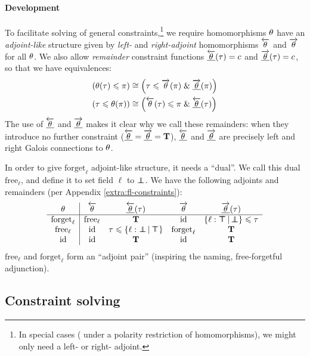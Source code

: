 \paragraph{Development}
To facilitate solving of general constraints,\footnote{In special cases (\eg{} under a polarity restriction of homomorphisms), we might only need a left- or right- adjoint.} we require homomorphisms $\theta$ have an \emph{adjoint-like} structure given by \emph{left-} and \emph{right-adjoint} homomorphisms $\overleftarrow{\theta}$ and $\overrightarrow{\theta}$ for all $\theta$. We also allow \emph{remainder} constraint functions $\underline{\overleftarrow{\theta}}(\tau) = c$ and $\underline{\overrightarrow{\theta}}(\tau) = c$, so that we have equivalences:
\begin{align*}
(\morph(\tau) \sub \pi) &\cstreq \left(\tau \sub \radj \morph(\pi) \und \radjrest \morph(\pi) \right) \\
(\tau \sub \morph(\pi)) &\cstreq \left(\ladj \morph(\tau) \sub \pi \und \ladjrest \morph(\tau) \right)
\end{align*}
The use of $\underline{\overleftarrow{\theta}}$ and $\underline{\overrightarrow{\theta}}$ makes it clear why we call these remainders: when they introduce no further constraint ($\underline{\overleftarrow{\theta}} = \underline{\overrightarrow{\theta}} = \mathbf T$), $\underline{\overleftarrow{\theta}}$ and $\underline{\overrightarrow{\theta}}$ are precisely left and right Galois connections to $\theta$.

\begin{example}
    In order to give $\mathrm{forget}_\ell$  adjoint-like structure, it needs a \enquote{dual}. We call this dual $\mathrm{free}_\ell$, and define it to set field $\ell$ to $\bot \!\!\!\! \bot$. We have the following adjoints and remainders (per Appendix \ref{extra:fl-constraints}):
    $$\begin{array}{c|cccc}
    \morph & \ladj \morph & \ladjrest \morph(\tau) & \radj \morph & \radjrest \morph(\tau) \\ \hline 
    \mathrm{forget}_\ell & \mathrm{free}_\ell & \tru & \mathrm{id} & \flext{\ell : \flftop}{\flfbot} \sub \tau \\
    \mathrm{free}_\ell & \mathrm{id} & \tau \sub \flext{\ell : \flfbot}{\flftop} & \mathrm{forget}_\ell & \tru \\ 
    \mathrm{id} & \mathrm{id} & \tru & \mathrm{id} & \tru 
    \end{array}$$    
    $\mathrm{free}_\ell$ and $\mathrm{forget}_\ell$ form an \enquote{adjoint pair} (inspiring the naming, \cf{} free-forgetful adjunction).
\end{example}

\subsection{Constraint solving}

